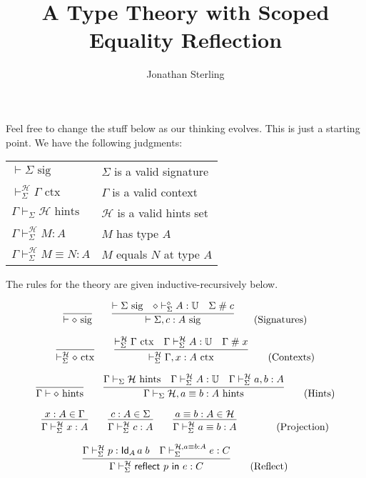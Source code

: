\documentclass{amsart}
\title{A Type Theory with Scoped Equality Reflection}
\author{Jonathan Sterling}
\begin{document}
\maketitle

\def\emp{\diamond}
\def\sig{\mbox{ sig}}
\def\ctx{\mbox{ ctx}}
\def\hints{\mbox{ hints}}
\def\fresh{\mathrel{\#}}

Feel free to change the stuff below as our thinking evolves. This is just a
starting point. We have the following judgments:

\bigskip
\begin{tabular}{ll}
$\vdash\Sigma\sig$                            & $\Sigma$ is a valid signature\\
$\vdash_\Sigma^\mathcal{H}\Gamma\ctx$         & $\Gamma$ is a valid context\\
$\Gamma\vdash_\Sigma\mathcal{H}\hints$        & $\mathcal{H}$ is a valid hints set\\
$\Gamma\vdash_\Sigma^\mathcal{H} M:A$         & $M$ has type $A$\\
$\Gamma\vdash_\Sigma^\mathcal{H} M\equiv N:A$ & $M$ equals $N$ at type $A$
\end{tabular}
\bigskip

\noindent
The rules for the theory are given inductive-recursively below.

\begin{equation}
  \infer{\vdash\emp\sig}{}
  \qquad
  \infer{
    \vdash\Sigma,c:A\sig
  }{
    \vdash\Sigma\sig &
    \emp\vdash_\Sigma^\emp A:\mathbb{U} &
    \Sigma\fresh c
  }
  \tag{Signatures}
\end{equation}

\begin{equation}
  \infer{\vdash_\Sigma^\mathcal{H}\emp\ctx}{}
  \qquad
  \infer{
    \vdash_\Sigma^\mathcal{H}\Gamma,x:A\ctx
  }{
    \vdash_\Sigma^\mathcal{H}\Gamma\ctx &
    \Gamma\vdash_\Sigma^\mathcal{H} A:\mathbb{U} &
    \Gamma\fresh x
  }
  \tag{Contexts}
\end{equation}

\begin{equation}
  \infer{\Gamma\vdash \emp\hints}{}
  \qquad
  \infer{
    \Gamma\vdash_\Sigma \mathcal{H}, a\equiv b:A\hints
  }{
    \Gamma\vdash_\Sigma \mathcal{H}\hints &
    \Gamma\vdash_\Sigma^\mathcal{H} A: \mathbb{U} &
    \Gamma\vdash_\Sigma^\mathcal{H} a,b : A
  }
  \tag{Hints}
\end{equation}

\begin{equation}
  \infer{
    \Gamma\vdash_\Sigma^\mathcal{H} x:A
  }{
    x:A\in\Gamma
  }
  \qquad
  \infer{
    \Gamma\vdash_\Sigma^\mathcal{H} c:A
  }{
    c:A\in\Sigma
  }
  \qquad
  \infer{
    \Gamma\vdash_\Sigma^\mathcal{H} a\equiv b:A
  }{
    a\equiv b:A \in \mathcal{H}
  }
  \qquad
  \tag{Projection}
\end{equation}

\begin{equation}
  \infer{
    \Gamma\vdash_\Sigma^\mathcal{H} \mathsf{reflect}\ p\ \mathsf{in}\ e : C
  }{
    \Gamma\vdash_\Sigma^\mathcal{H} p : \mathsf{Id}_A\,a\;b &
    \Gamma\vdash_\Sigma^{\mathcal{H},a\equiv b:A} e : C
  }
  \tag{Reflect}
\end{equation}
\end{document}
